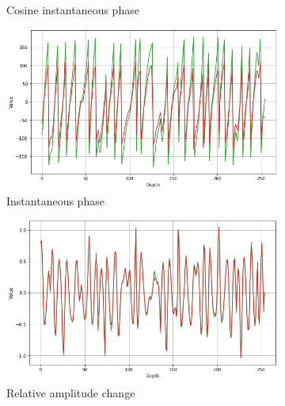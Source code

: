 \documentclass[conference]{IEEEtran}
\begin{document}
\begin{figure}[!t]
\begin{subfigure}[b]{\figcompwidth\textwidth}
        \caption{Cosine instantaneous phase}
        \label{fig:ciptrace}
     \end{subfigure}
     
     \begin{subfigure}[b]{\figcompwidth\textwidth}
         \centering
        \includegraphics[width=1.0\columnwidth]{Fig/newFigs/instantaneous-phase-trace.png}
        \caption{Instantaneous phase}
        \label{fig:iptrace}
     \end{subfigure}
     \begin{subfigure}[b]{\figcompwidth\textwidth}
         \centering
        \includegraphics[width=1.0\columnwidth]{Fig/newFigs/relative-amplitude-change-trace.png}
        \caption{Relative amplitude change}
        \label{fig:ractrace}
     \end{subfigure}
     \begin{subfigure}[b]{\figcompwidth\textwidth}
         \centering

\end{subfigure}
\end{figure}
\end{document}
